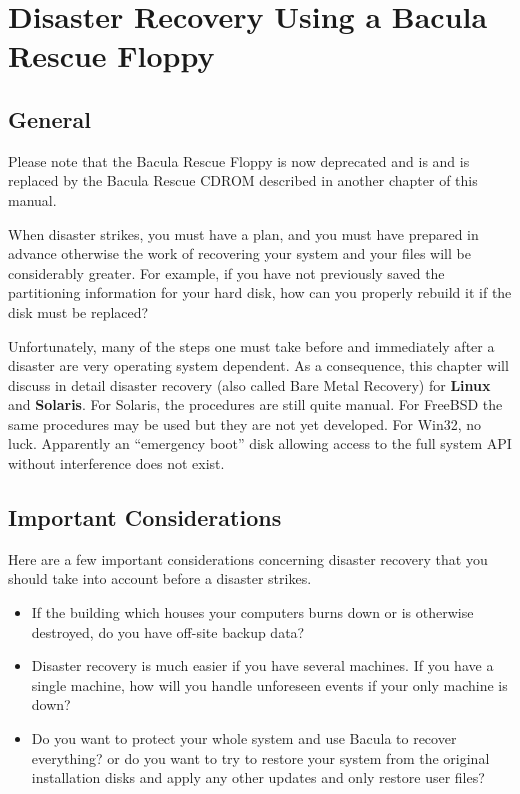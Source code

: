 
\section*{Disaster Recovery Using a Bacula Rescue Floppy}
\label{_ChapterStart24}

\subsection*{General}

Please note that the Bacula Rescue Floppy is now deprecated and is 
and is replaced by the Bacula Rescue CDROM described in another
chapter of this manual.

When disaster strikes, you must have a plan, and you must have prepared in
advance otherwise the work of recovering your system and your files will be
considerably greater. For example, if you have not previously saved the
partitioning information for your hard disk, how can you properly rebuild it
if the disk must be replaced? 

Unfortunately, many of the steps one must take before and immediately after a
disaster are very operating system dependent. As a consequence, this chapter
will discuss in detail disaster recovery (also called Bare Metal Recovery) for
{\bf Linux} and {\bf Solaris}. For Solaris, the procedures are still quite
manual. For FreeBSD the same procedures may be used but they are not yet
developed. For Win32, no luck. Apparently an ``emergency boot'' disk allowing
access to the full system API without interference does not exist. 
\label{considerations}

\subsection*{Important Considerations}

Here are a few important considerations concerning disaster recovery that you
should take into account before a disaster strikes. 

\begin{itemize}
\item If the building which houses your computers burns down or is otherwise 
   destroyed, do you have off-site backup data? 
\item Disaster recovery is much easier if you have several machines. If  you
   have a single machine, how will you handle unforeseen events  if your only
   machine is down? 
\item Do you want to protect your whole system and use Bacula to  recover
   everything? or do you want to try to restore your system from  the original
   installation disks and apply any other updates and  only restore user files? 
\end{itemize}

